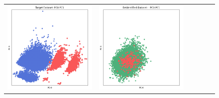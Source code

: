 \begin{figure}[p!]
\begin{tabular}{@{} M{0.166\textwidth} M{0.166\textwidth} | M{0.166\textwidth} M{0.166\textwidth} | M{0.166\textwidth} M{0.166\textwidth} @{}}
       \includegraphics[width=\linewidth]{z_Pategan.orig.png} &
       \includegraphics[width=\linewidth]{z_Pategan.syn.png} \\ 

\end{tabular}
\end{figure}
